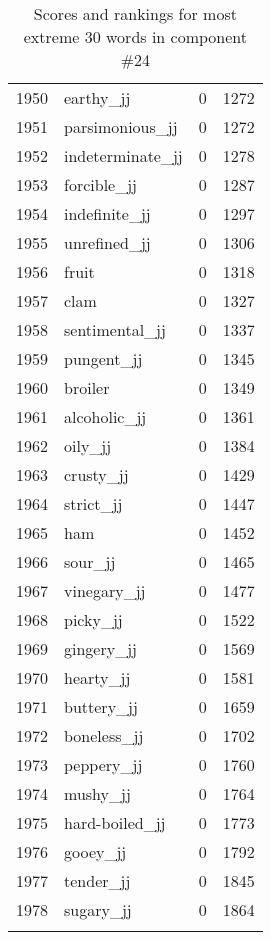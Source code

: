 \begin{longtable}[!htbp]{| rlr@{.}l |}
    1950 & earthy\_jj & 0 & 1272 \\
    1951 & parsimonious\_jj & 0 & 1272 \\
    1952 & indeterminate\_jj & 0 & 1278 \\
    1953 & forcible\_jj & 0 & 1287 \\
    1954 & indefinite\_jj & 0 & 1297 \\
    1955 & unrefined\_jj & 0 & 1306 \\
    1956 & fruit & 0 & 1318 \\
    1957 & clam & 0 & 1327 \\
    1958 & sentimental\_jj & 0 & 1337 \\
    1959 & pungent\_jj & 0 & 1345 \\
    1960 & broiler & 0 & 1349 \\
    1961 & alcoholic\_jj & 0 & 1361 \\
    1962 & oily\_jj & 0 & 1384 \\
    1963 & crusty\_jj & 0 & 1429 \\
    1964 & strict\_jj & 0 & 1447 \\
    1965 & ham & 0 & 1452 \\
    1966 & sour\_jj & 0 & 1465 \\
    1967 & vinegary\_jj & 0 & 1477 \\
    1968 & picky\_jj & 0 & 1522 \\
    1969 & gingery\_jj & 0 & 1569 \\
    1970 & hearty\_jj & 0 & 1581 \\
    1971 & buttery\_jj & 0 & 1659 \\
    1972 & boneless\_jj & 0 & 1702 \\
    1973 & peppery\_jj & 0 & 1760 \\
    1974 & mushy\_jj & 0 & 1764 \\
    1975 & hard-boiled\_jj & 0 & 1773 \\
    1976 & gooey\_jj & 0 & 1792 \\
    1977 & tender\_jj & 0 & 1845 \\
    1978 & sugary\_jj & 0 & 1864 \\
    \hline
    \caption{Scores and rankings for most extreme 30 words in component \#24} \\
\end{longtable}
